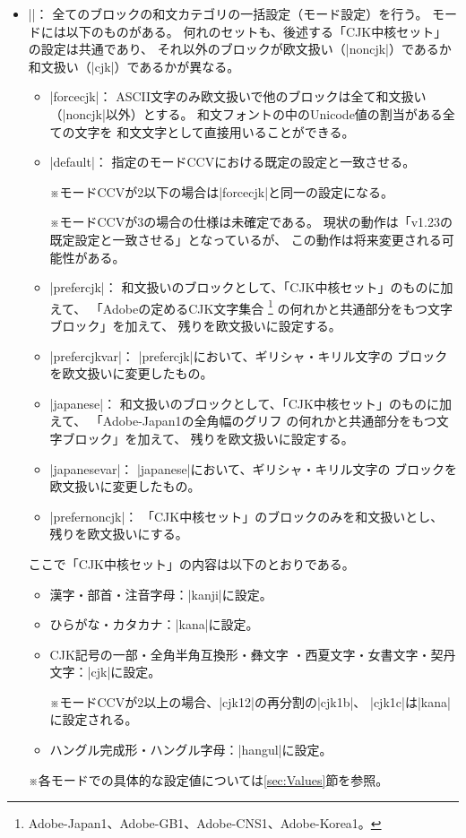 \documentclass[uplatex,dvipdfmx,a4paper]{jsarticle}
\newcommand{\Meta}[1]{$\langle$\mbox{}#1\mbox{}$\rangle$}
\newcommand{\Note}{\par\noindent ※}
\newcommand{\Means}{：\quad}
\newcommand{\strong}{\textsf}
\begin{document}
\begin{itemize}
\item |\cjkcategorymode{|\Meta{モード}|}|\Means
  全てのブロックの和文カテゴリの一括設定（モード設定）を行う。
  モードには以下のものがある。
  何れのセットも、後述する「CJK中核セット」の設定は共通であり、
  それ以外のブロックが欧文扱い（|noncjk|）であるか
  和文扱い（|cjk|）であるかが異なる。
  \begin{itemize}
  \item |forcecjk|\Means
    ASCII文字のみ欧文扱いで他のブロックは全て和文扱い
    （|noncjk|以外）とする。
    和文フォントの中のUnicode値の割当がある全ての文字を
    和文文字として直接用いることができる。
  \item |default|\Means
    指定のモードCCVにおける既定の設定と一致させる。
    \Note モードCCVが2以下の場合は|forcecjk|と同一の設定になる。
    \Note モードCCVが3の場合の\strong{仕様は未確定}である。
      現状の動作は「v1.23の既定設定と一致させる」となっているが、
      この動作は\strong{将来変更される可能性がある}。
  \item |prefercjk|\Means
    和文扱いのブロックとして、「CJK中核セット」のものに加えて、
    「Adobeの定めるCJK文字集合
    \footnote{Adobe-Japan1、Adobe-GB1、Adobe-CNS1、Adobe-Korea1。}%
    の何れかと共通部分をもつ文字ブロック」を加えて、
    残りを欧文扱いに設定する。
  \item |prefercjkvar|\Means
    |prefercjk|において、ギリシャ・キリル文字の
    ブロックを欧文扱いに変更したもの。
  \item |japanese|\Means
    和文扱いのブロックとして、「CJK中核セット」のものに加えて、
    「Adobe-Japan1の全角幅のグリフ
    の何れかと共通部分をもつ文字ブロック」を加えて、
    残りを欧文扱いに設定する。
  \item |japanesevar|\Means
    |japanese|において、ギリシャ・キリル文字の
    ブロックを欧文扱いに変更したもの。
  \item |prefernoncjk|\Means
    「CJK中核セット」のブロックのみを和文扱いとし、
    残りを欧文扱いにする。
  \end{itemize}

  ここで「CJK中核セット」の内容は以下のとおりである。
    \begin{itemize}
    \item 漢字・部首・注音字母\Means |kanji|に設定。
    \item ひらがな・カタカナ\Means |kana|に設定。
    \item CJK記号の一部・全角半角互換形・彝文字
      ・西夏文字・女書文字・契丹文字\Means |cjk|に設定。
      \Note モードCCVが2以上の場合、|cjk12|の再分割の|cjk1b|、
        |cjk1c|は|kana|に設定される。
    \item ハングル完成形・ハングル字母\Means |hangul|に設定。
  \end{itemize}
  \Note 各モードでの具体的な設定値については\ref{sec:Values}節を参照。

\end{itemize}
\end{document}

